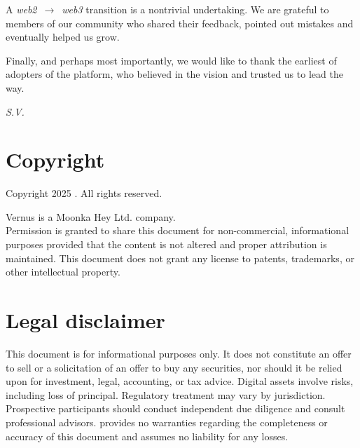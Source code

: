 \documentclass[10pt]{article}
\begin{document}
    A \textit{web2}~$\longrightarrow$~\textit{web3} transition is a nontrivial undertaking. We are grateful to members of our community who shared their feedback, pointed out mistakes and eventually helped us grow.

    Finally, and perhaps most importantly, we would like to thank the earliest of adopters of the platform, who believed in the vision and trusted us to lead the way.

    \textit{S.V.}
  \clearpage

  \section*{Copyright}
    \noindent Copyright \textcopyright{} 2025 \projectname{}. All rights reserved.

    \noindent Vernus is a Moonka Hey Ltd. company.\\

    \noindent Permission is granted to share this document for non-commercial, informational purposes provided that the content is not altered and proper attribution is maintained. This document does not grant any license to patents, trademarks, or other intellectual property.

  \section*{Legal disclaimer}
    This document is for informational purposes only. It does not constitute an offer to sell or a solicitation of an offer to buy any securities, nor should it be relied upon for investment, legal, accounting, or tax advice. Digital assets involve risks, including loss of principal. Regulatory treatment may vary by jurisdiction. Prospective participants should conduct independent due diligence and consult professional advisors. \projectname{} provides no warranties regarding the completeness or accuracy of this document and assumes no liability for any losses.

  \clearpage

  {\setlength{\parskip}{0pt}\tableofcontents}
  \let\oldsection\section
  \renewcommand{\section}{\clearpage\oldsection}
\end{document}
